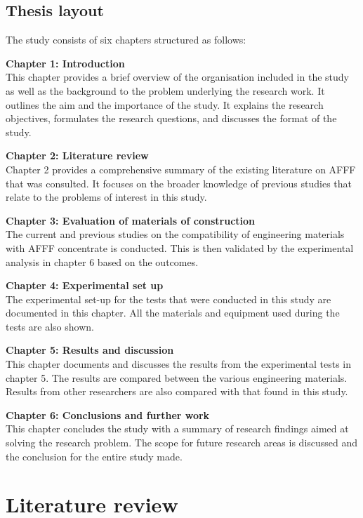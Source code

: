 \documentclass[12pt]{report}
\begin{document}
\section{Thesis layout}
The study consists of six chapters structured as follows:

\noindent \textbf{Chapter 1: Introduction} \\ 
This chapter provides a brief overview of the organisation included in the study as well as the background to the problem underlying the research work. It outlines the aim and the importance of the study. It explains the research objectives, formulates the research questions, and discusses the format of the study.

\noindent \textbf{Chapter 2: Literature review} \\
Chapter 2 provides a comprehensive summary of the existing literature on AFFF that was consulted. It focuses on the broader knowledge of previous studies that relate to the problems of interest in this study.

\noindent \textbf{Chapter 3: Evaluation of materials of construction} \\
The current and previous studies on the compatibility of engineering materials with AFFF concentrate is conducted. This is then validated by the experimental analysis in chapter 6 based on the outcomes.

\noindent \textbf{Chapter 4: Experimental set up} \\
The experimental set-up for the tests that were conducted in this study are documented in this chapter. All the materials and equipment used during the tests are also shown.

\noindent \textbf{Chapter 5: Results and discussion} \\
This chapter documents and discusses the results from the experimental tests in chapter 5. The results are compared between the various engineering materials. Results from other researchers are also compared with that found in this study. 

\noindent \textbf{Chapter 6: Conclusions and further work} \\
This chapter concludes the study with a summary of research findings aimed at solving the
research problem. The scope for future research areas is discussed and the conclusion for the entire study made.

\chapter{Literature review}
\end{document}
